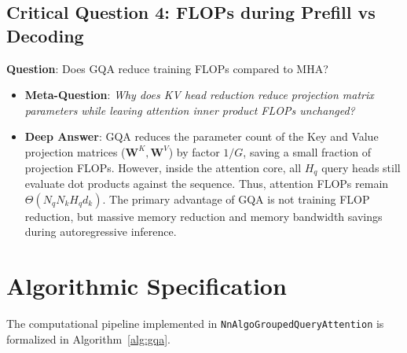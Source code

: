 \documentclass[11pt,a4paper]{article}
\theoremstyle{definition}
\begin{document}
\subsection{\textbf{Critical Question 4: FLOPs during Prefill vs Decoding}}
\textbf{Question}: Does GQA reduce training FLOPs compared to MHA?
\begin{itemize}
    \item \textbf{Meta-Question}: \emph{Why does KV head reduction reduce projection matrix parameters while leaving attention inner product FLOPs unchanged?}
    \item \textbf{Deep Answer}: GQA reduces the parameter count of the Key and Value projection matrices ($\mathbf{W}^K, \mathbf{W}^V$) by factor $1/G$, saving a small fraction of projection FLOPs. However, inside the attention core, all $H_q$ query heads still evaluate dot products against the sequence. Thus, attention FLOPs remain $\Theta(N_q N_k H_q d_k)$. The primary advantage of GQA is not training FLOP reduction, but massive memory reduction and memory bandwidth savings during autoregressive inference.
\end{itemize}

\section{Algorithmic Specification}

The computational pipeline implemented in \texttt{NnAlgoGroupedQueryAttention} is formalized in Algorithm~\ref{alg:gqa}.
\end{document}
